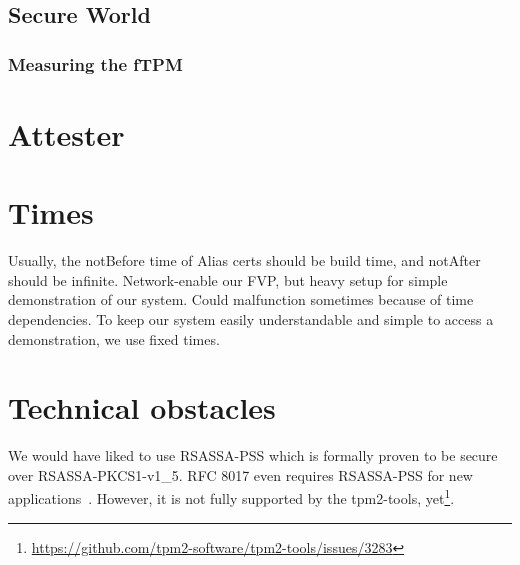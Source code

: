\subsection{Secure World}

\subsubsection{Measuring the fTPM}

\section{Attester}

\section{Times}

Usually, the notBefore time of Alias certs should be build time, and notAfter should be infinite.
Network-enable our FVP, but heavy setup for simple demonstration of our system.
Could malfunction sometimes because of time dependencies.
To keep our system easily understandable and simple to access a demonstration, we use fixed times.


\section{Technical obstacles}

We would have liked to use RSASSA-PSS which is formally proven to be secure over RSASSA-PKCS1-v1\_5.
RFC 8017 even requires RSASSA-PSS for new applications~\cite{Moriarty2016}.
However, it is not fully supported by the tpm2-tools, yet\footnote{\url{https://github.com/tpm2-software/tpm2-tools/issues/3283}}.

